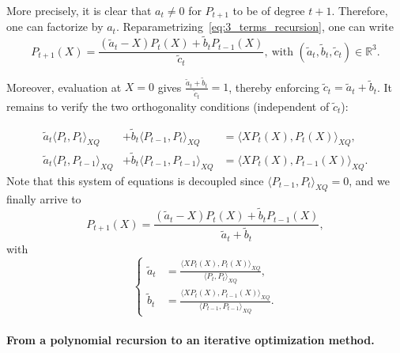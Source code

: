 \documentclass{article}
\begin{document}
        More precisely, it is clear that $a_t\neq 0$ for $P_{t+1}$ to be of degree $t+1$.
        Therefore, one can factorize by $a_t$.
        Reparametrizing~\cref{eq:3_terms_recursion}, one can write
        \begin{equation*}
            P_{t+1}(X) = \frac{(\tilde{a}_t - X) P_t(X) + \tilde{b}_t P_{t-1}(X)}{\tilde{c}_t}, ~\text{with } (\tilde{a}_t, \tilde{b}_t, \tilde{c}_t)\in\mathbb{R}^3.
        \end{equation*}

        Moreover, evaluation at $X=0$ gives $\frac{\tilde{a}_t + \tilde{b}_t}{\tilde{c}_t}=1$, thereby enforcing $\tilde{c}_t = \tilde{a}_t + \tilde{b}_t$.
        It remains to verify the two orthogonality conditions (independent of $\tilde{c}_t$):

        \begin{equation*}
            \begin{array}{lll}
                \tilde{a}_t \langle P_t, P_t \rangle_{XQ} & + \tilde{b}_t \langle P_{t-1}, P_t \rangle_{XQ} & = \langle X P_t(X), P_t(X) \rangle_{XQ}, \\
                \tilde{a}_t \langle P_t, P_{t-1} \rangle_{XQ} & + \tilde{b}_t \langle P_{t-1}, P_{t-1} \rangle_{XQ} & = \langle X P_t(X), P_{t-1}(X) \rangle_{XQ}.
            \end{array}
        \end{equation*}
        Note that this system of equations is decoupled since $\langle P_{t-1}, P_t \rangle_{XQ}=0$, and we finally arrive to
        \begin{equation}
            P_{t+1}(X) = \frac{(\tilde{a}_t - X) P_t(X) + \tilde{b}_t P_{t-1}(X)}{\tilde{a}_t + \tilde{b}_t}, \label{eq:final_poly_recursion}
        \end{equation}
        with
        \begin{equation}
            \left\{
                \begin{array}{ll}
                    \tilde{a}_t & = \frac{\langle X P_t(X), P_t(X) \rangle_{XQ}}{\langle P_t, P_t \rangle_{XQ}}, \\
                    \tilde{b}_t & = \frac{\langle X P_t(X), P_{t-1}(X) \rangle_{XQ}}{\langle P_{t-1}, P_{t-1} \rangle_{XQ}}.
                \end{array}
            \right.
            \label{eq:an_and_bn_values}
        \end{equation}

    \paragraph{From a polynomial recursion to an iterative optimization method.}
\end{document}
